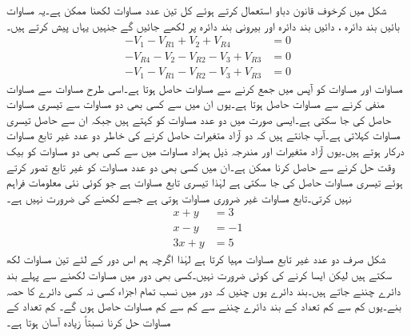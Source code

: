 شکل  میں کرخوف قانون دباو استعمال کرتے ہوئے کل تین عدد مساوات لکھنا ممکن ہے۔یہ مساوات بائیں بند دائرہ ، دائیں بند دائرہ  اور بیرونی بند دائرہ  پر لکھے جائیں گے جنہیں یہاں پیش کرتے ہیں۔
\begin{align}
-V_1-V_{R1}+V_2+V_{R4}&=0  \label{مساوات_مزاحمتی_تابع_الف}\\
-V_{R4}-V_2-V_{R2}-V_3+V_{R3}&=0  \label{مساوات_مزاحمتی_تابع_ب}\\
-V_1-V_{R1}-V_{R2}-V_3+V_{R3}&=0  \label{مساوات_مزاحمتی_تابع_پ}
\end{align}
مساوات  اور مساوات  کو آپس میں جمع کرنے سے مساوات  حاصل ہوتا ہے۔اسی طرح مساوات  سے مساوات  منفی کرنے سے مساوات  حاصل ہوتا ہے۔یوں ان میں سے کسی بھی دو مساوات سے تیسری مساوات حاصل کی جا سکتی ہے۔ایسی صورت میں دو عدد مساوات کو  کہتے ہیں جبکہ ان سے حاصل تیسری مساوات  کہلاتی ہے۔آپ جانتے ہیں کہ دو آزاد متغیرات حاصل کرنے کی خاطر دو عدد غیر تابع مساوات درکار ہوتے ہیں۔یوں آزاد متغیرات  اور  مندرجہ ذیل ہمزاد مساوات  میں سے کسی بھی دو مساوات کو بیک وقت حل کرنے سے حاصل کرنا ممکن ہے۔ان میں کسی بھی دو عدد مساوات کو غیر تابع تصور کرتے ہوئے تیسری مساوات حاصل کی جا سکتی ہے لہٰذا تیسری تابع مساوات ہے جو کوئی نئی معلومات فراہم نہیں کرتی۔تابع مساوات غیر ضروری مساوات ہوتی ہے جسے لکھنے کی ضرورت نہیں ہے۔
\begin{align*}
x+y&=3\\
x-y&=-1\\
3x+y&=5
\end{align*}
شکل  صرف دو عدد غیر تابع مساوات مہیا کرتا ہے لہٰذا اگرچہ ہم اس دور کے لئے تین مساوات لکھ سکتے ہیں لیکن ایسا کرنے کی کوئی ضرورت نہیں۔کسی بھی دور میں مساوات لکھنے سے پہلے بند دائرے چننے جاتے ہیں۔بند دائرے یوں چنیں کہ دور میں نسب تمام اجزاء کسی نہ کسی دائرے کا حصہ بنے۔یوں کم سے کم تعداد کے بند دائرے چننے سے کم سے کم مساوات حاصل ہوں گے۔ کم تعداد کے مساوات حل کرنا نسبتاً زیادہ آسان ہوتا ہے۔

